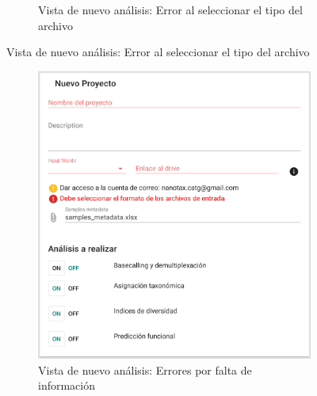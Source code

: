 \begin{figure}[H]
\begin{subfigure}[b]{0.45\textwidth}
        \caption{Vista de nuevo análisis: Error al seleccionar el tipo del archivo}
        \label{fig:app-new-analysis-fastq-error}
    \end{subfigure}
    \caption{Vista de nuevo análisis: Error al seleccionar el tipo del archivo}
    \label{fig:app-new-analysis-type-file-error}
\end{figure}



\begin{figure}[H]
    \centering
    \begin{subfigure}[b]{0.45\textwidth}
        \centering
        \includegraphics[width=\textwidth]{images/app/newAnalysis/errors1.png}
        \caption{Vista de nuevo análisis: Errores por falta de información}
        \label{fig:app-new-analysis-nodata-error}
    \end{subfigure}
    \hfill
    \begin{subfigure}[b]{0.45\textwidth}
        \centering

\end{subfigure}
\end{figure}
